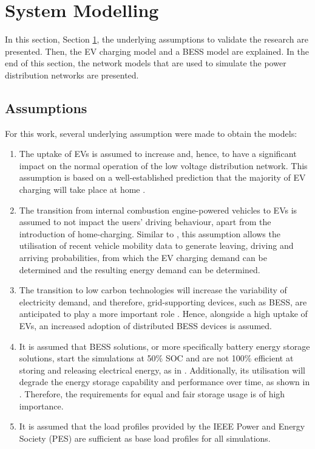 \section{System Modelling}
\label{ch4:sec:system-modelling}

In this section, Section \ref{ch4:sec:system-modelling}, the underlying assumptions to validate the research are presented.
Then, the EV charging model and a BESS model are explained.
In the end of this section, the network models that are used to simulate the power distribution networks are presented.

\subsection{Assumptions}
\label{ch4:subsec:assumptions}

For this work, several underlying assumption were made to obtain the models:

\begin{enumerate}
\item
The uptake of EVs is assumed to increase and, hence, to have a significant impact on the normal operation of the low voltage distribution network.
This assumption is based on a well-established prediction that the majority of EV charging will take place at home \cite{Munkhammar2015a}.
\item
The transition from internal combustion engine-powered vehicles to EVs is assumed to not impact the users' driving behaviour, apart from the introduction of home-charging.
Similar to \cite{Dallinger2012}, this assumption allows the utilisation of recent vehicle mobility data \cite{MiD2008} to generate leaving, driving and arriving probabilities, from which the EV charging demand can be determined and the resulting energy demand can be determined.
\item
The transition to low carbon technologies will increase the variability of electricity demand, and therefore, grid-supporting devices, such as BESS, are anticipated to play a more important role \cite{FES2015}.
Hence, alongside a high uptake of EVs, an increased adoption of distributed BESS devices is assumed.
\item
It is assumed that BESS solutions, or more specifically battery energy storage solutions, start the simulations at 50\% SOC and are not 100\% efficient at storing and releasing electrical energy, as in \cite{Rowe2014a}.
Additionally, its utilisation will degrade the energy storage capability and performance over time, as shown in \cite{Laresgoiti2015}.
Therefore, the requirements for equal and fair storage usage is of high importance.
\item
It is assumed that the load profiles provided by the IEEE Power and Energy Society (PES) are sufficient as base load profiles for all simulations.
\end{enumerate}

